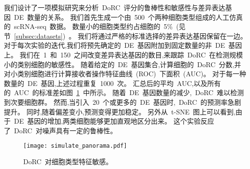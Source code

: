 
我们设计了一项模拟研究来分析~DoRC~评分的鲁棒性和敏感性与差异表达基因~DE~数量的关系。
我们首先生成一个由~500~个两种细胞类型组成的人工仿真的~scRNA-seq~数据。
数量小的细胞类型约占细胞的~5\%~(见节~\ref{subsec:datasets})~。
我们将通过严格的标准选择的差异表达基因保留在一边。
对于每次实验的迭代,我们将预先确定的~DE~基因附加到固定数量的非~DE~基因上。
我们在~1~和~150~之间改变差异表达基因的数目,来跟踪~DoRC~在检测规模小的类别细胞的敏感性。
随着给定的~DE~基因集合,计算细胞的~DoRC~分数,并对小类别细胞进行计算接收者操作特征曲线~(ROC)~下面积~(AUC)。
对于每一种数量的~DE~基因,上述过程重复~1000~次。
汇总后的平均~AUC,以及所有的~AUC~的标准差如图~\ref{fig:simulate:roc}~中所示。
随着~DE~基因数量的减少,~DoRC~难以检测到次要细胞群。
然而,当引入~20~个或更多的~DE~基因时,~DoRC~的预测率急剧提升。
同时,随着偏差变小,预测变得更加稳定。
另外从~t-SNE~图上可以看到,由于~DE~基因的增加,两类细胞能够更加直观地区分出来。
这个实验反应了~DoRC~对噪声具有一定的鲁棒性。

\begin{figure}[!htbp]
    \centering
    \texttt{[image: simulate\_panorama.pdf]}
    \caption{
    DoRC~对细胞类型特征敏感。
    }
    \label{fig:simulate:roc}
\end{figure}

